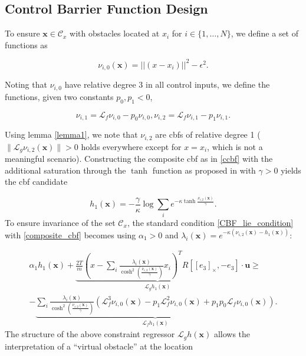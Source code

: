 \subsection{Control Barrier Function Design}
To ensure $\mathbf{x} \in \mathcal{C}_x$ with obstacles located at $x_i$ for $i\in \{1, \hdots, N \}$, we define a set of functions as

\begin{equation}\label{position_cbf}
   \nu_{i,0}(\mathbf{x}) = ||(x-x_i)||^2 - \epsilon^2.
\end{equation}

Noting that $\nu_{i,0}$ have relative degree 3 in all control inputs, we define the functions, given two constants $p_0, p_1 < 0$,

\small
\begin{subequations}\label{composition1}
    \begin{equation}
        \nu_{i,1} = \mathcal{L}_f \nu_{i,0} - p_{0} \nu_{i,0},
    \end{equation}
    \begin{equation}
        \nu_{i,2} = \mathcal{L}_f \nu_{i,1} - p_{1} \nu_{i,1}.
    \end{equation}
\end{subequations}
\normalsize

Using lemma \ref{lemma1}, we note that $\nu_{i,2}$ are \acp{cbf} of relative degree 1 ($\|\mathcal{L}_g \nu_{i,2}(\mathbf{x})\|>0$ holds everywhere except for $x=x_i$, which is not a meaningful scenario). Constructing the composite \ac{cbf} as in \eqref{ccbf} with the additional saturation through the $\tanh$ function as proposed in \cite{compositeCBFames} with $\gamma>0$ yields the \ac{cbf} candidate

\small
\begin{equation}\label{composite_cbf}
    h_1(\mathbf{x}) = - \frac{\gamma}{\kappa} \log \sum_i e^{-\kappa 
\tanh{\frac{ \nu_{i,2}(\mathbf{x})}{\gamma}}}.
\end{equation}
\normalsize
To ensure invariance of the set $\mathcal{C}_x$, the standard condition 
\eqref{CBF_lie_condition} with \eqref{composite_cbf} becomes using $\alpha_1 > 0$ and $\lambda_i(\mathbf{x}) = e ^ {-\kappa (\nu_{i,2}(\mathbf{x}) - h_1(\mathbf{x}) )}$:


\small
\begin{equation}\label{composite_invariance}
\begin{split}
    \alpha_1 h_1(\mathbf{x}) +
    \underbrace{\frac{2T}{m}(x- \sum_i \frac{\lambda_i(\mathbf{x})}{\cosh^2(\frac{\nu_{i,2}(\mathbf{x})}{\gamma})} x_i)^T R [  [e_3]_\times, - e_3]}_{\mathcal{L}_g h_1(\mathbf{x})} \cdot \mathbf{u} \geq \\
    - \underbrace{ \sum_i \frac{\lambda_i(\mathbf{x})}{\cosh^2(\frac{\nu_{i,2}(\mathbf{x})}{\gamma})} (\mathcal{L}_f^3 \nu_{i,0} (\mathbf{x}) - p_1\mathcal{L}_f^2 \nu_{i,0} (\mathbf{x}) + p_1 p_0\mathcal{L}_f \nu_{i,0} (\mathbf{x}))}_{\mathcal{L}_f h_1(\mathbf{x})} \text{.}
\end{split}
\end{equation}
\normalsize
The structure of the above constraint regressor $\mathcal{L}_g h(\mathbf{x})$ allows the interpretation of a ``virtual obstacle'' at the location 

